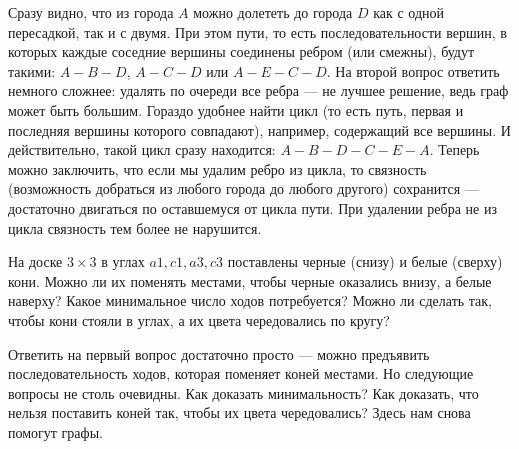 Сразу видно, что из города $A$ можно долететь до города $D$ как с
одной пересадкой, так и с двумя. При этом пути, то есть
последовательности вершин, в которых каждые соседние вершины 
соединены ребром (или смежны), будут такими: $A-B-D$, $A-C-D$ или
$A-E-C-D$. На второй вопрос ответить немного сложнее: удалять по
очереди все ребра --- не лучшее решение, ведь граф может быть
большим. Гораздо удобнее найти цикл (то есть путь, первая и
последняя вершины которого совпадают), например, содержащий все
вершины. И действительно, такой цикл сразу находится: $A-B-D-C-E-A$.
Теперь можно заключить, что если мы удалим ребро из цикла, то
связность (возможность добраться из любого города до любого другого)
сохранится --- достаточно двигаться по оставшемуся от цикла пути. При
удалении ребра не из цикла связность тем более не нарушится.

\begin{task}
    На доске $3 \times 3$ в углах $a1, c1, a3, c3$ поставлены
    черные (снизу) и белые (сверху) кони. Можно ли их поменять местами,
    чтобы черные оказались внизу, а белые наверху? Какое минимальное
    число ходов потребуется? Можно ли сделать так, чтобы кони
    стояли в углах, а их цвета чередовались по кругу?
\end{task}

Ответить на первый вопрос достаточно просто --- можно предъявить
последовательность ходов, которая поменяет коней местами. Но
следующие вопросы не столь очевидны. Как доказать минимальность?
Как доказать, что нельзя поставить коней так, чтобы их цвета
чередовались? Здесь нам снова помогут графы.

